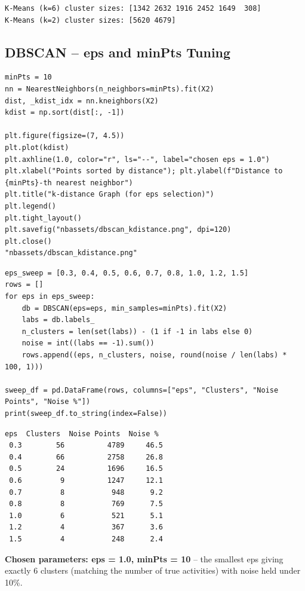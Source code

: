 \documentclass[12pt,a4paper]{article}
\begin{document}
\begin{verbatim}
K-Means (k=6) cluster sizes: [1342 2632 1916 2452 1649  308]
K-Means (k=2) cluster sizes: [5620 4679]
\end{verbatim}

\subsection{DBSCAN -- eps and minPts Tuning}
\label{sec:orgfcef358}

\begin{verbatim}
minPts = 10
nn = NearestNeighbors(n_neighbors=minPts).fit(X2)
dist, _kdist_idx = nn.kneighbors(X2)
kdist = np.sort(dist[:, -1])

plt.figure(figsize=(7, 4.5))
plt.plot(kdist)
plt.axhline(1.0, color="r", ls="--", label="chosen eps = 1.0")
plt.xlabel("Points sorted by distance"); plt.ylabel(f"Distance to {minPts}-th nearest neighbor")
plt.title("k-distance Graph (for eps selection)")
plt.legend()
plt.tight_layout()
plt.savefig("nbassets/dbscan_kdistance.png", dpi=120)
plt.close()
"nbassets/dbscan_kdistance.png"
\end{verbatim}

\url{}

\begin{verbatim}
eps_sweep = [0.3, 0.4, 0.5, 0.6, 0.7, 0.8, 1.0, 1.2, 1.5]
rows = []
for eps in eps_sweep:
    db = DBSCAN(eps=eps, min_samples=minPts).fit(X2)
    labs = db.labels_
    n_clusters = len(set(labs)) - (1 if -1 in labs else 0)
    noise = int((labs == -1).sum())
    rows.append((eps, n_clusters, noise, round(noise / len(labs) * 100, 1)))

sweep_df = pd.DataFrame(rows, columns=["eps", "Clusters", "Noise Points", "Noise %"])
print(sweep_df.to_string(index=False))
\end{verbatim}

\begin{verbatim}
eps  Clusters  Noise Points  Noise %
 0.3        56          4789     46.5
 0.4        66          2758     26.8
 0.5        24          1696     16.5
 0.6         9          1247     12.1
 0.7         8           948      9.2
 0.8         8           769      7.5
 1.0         6           521      5.1
 1.2         4           367      3.6
 1.5         4           248      2.4
\end{verbatim}

\textbf{Chosen parameters: eps = 1.0, minPts = 10} -- the smallest eps giving
exactly 6 clusters (matching the number of true activities) with noise
held under 10\%.
\end{document}
